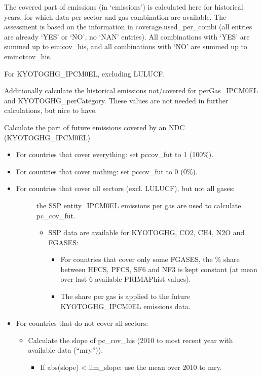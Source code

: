 \documentclass[letterpaper,10pt,english]{sphinxmanual}
\begin{document}
The covered part of emissions (in ‘emissions’) is calculated here for historical years, for which data per sector and gas combination are available.
The assessment is based on the information in coverage.used\_per\_combi (all entries are already ‘YES’ or ‘NO’, no ‘NAN’ entries).
All combinations with ‘YES’ are summed up to emicov\_his, and all combinations with ‘NO’ are summed up to eminotcov\_his.

For KYOTOGHG\_IPCM0EL, excluding LULUCF.

Additionally calculate the historical emissions not\sphinxhyphen{}/covered for perGas\_IPCM0EL and KYOTOGHG\_perCategory.
These values are not needed in further calculations, but nice to have.

Calculate the part of future emissions covered by an NDC (KYOTOGHG\_IPCM0EL)
\begin{itemize}
\item {} 
For countries that cover everything: set pccov\_fut to 1 (100\%).

\item {} 
For countries that cover nothing: set pccov\_fut to 0 (0\%).

\item {} \begin{description}
\item[{For countries that cover all sectors (excl. LULUCF), but not all gases:}] \leavevmode
the SSP entity\_IPCM0EL emissions per gas are used to calculate pc\_cov\_fut.
\begin{itemize}
\item {} 
SSP data are available for KYOTOGHG, CO2, CH4, N2O and FGASES:
\begin{itemize}
\item {} 
For countries that cover only some FGASES, the \% share between HFCS, PFCS, SF6 and NF3 is kept constant (at mean over last 6 available PRIMAP\sphinxhyphen{}hist values).

\item {} 
The share per gas is applied to the future KYOTOGHG\_IPCM0EL emissions data.

\end{itemize}

\end{itemize}

\end{description}

\item {} 
For countries that do not cover all sectors:
\begin{itemize}
\item {} 
Calculate the slope of pc\_cov\_his (2010 to most recent year with available data (“mry”)).
\begin{itemize}
\item {} 
If abs(slope) \textless{} lim\_slope: use the mean over 2010 to mry.


\end{itemize}
\end{itemize}
\end{itemize}
\end{document}
